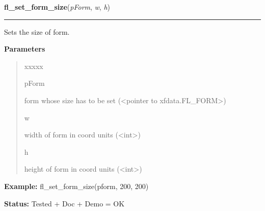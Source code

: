     \label{xformslib:library:fl_set_form_size}

    \vspace{0.5ex}

\hspace{.8\funcindent}\begin{boxedminipage}{\funcwidth}

    \raggedright \textbf{fl\_set\_form\_size}(\textit{pForm}, \textit{w}, \textit{h})

    \vspace{-1.5ex}

    \rule{\textwidth}{0.5\fboxrule}
\setlength{\parskip}{2ex}
    Sets the size of form.

\setlength{\parskip}{1ex}
      \textbf{Parameters}
      \vspace{-1ex}

      \begin{quote}
        \begin{Ventry}{xxxxx}

          \item[pForm]

          form whose size has to be set ({\textless}pointer to 
          xfdata.FL\_FORM{\textgreater})

          \item[w]

          width of form in coord units ({\textless}int{\textgreater})

          \item[h]

          height of form in coord units ({\textless}int{\textgreater})

        \end{Ventry}

      \end{quote}

\textbf{Example:} fl\_set\_form\_size(pform, 200, 200)



\textbf{Status:} Tested + Doc + Demo = OK



    \end{boxedminipage}

    \label{xformslib:library:fl_set_form_hotspot}

